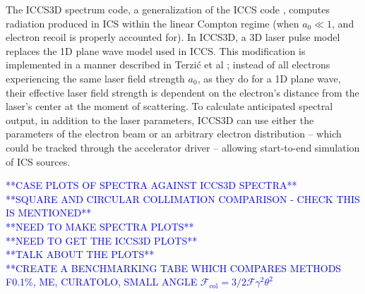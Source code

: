 \documentclass[../main.tex]{subfiles}
\begin{document}
The \textsc{ICCS3D} spectrum code, a generalization of the \textsc{ICCS} code \cite{krafft2016laser,ranjan2018simulation}, computes radiation produced in ICS within the linear Compton regime (when $a_{0}\ll 1$, and electron recoil is properly accounted for). In \textsc{ICCS3D}, a 3D laser pulse model replaces the 1D plane wave model used in \textsc{ICCS}. This modification is implemented in a manner described in Terzi\'c et al \cite{terzic2019improving}; instead of all electrons experiencing the same laser field strength $a_{0}$, as they do for a 1D plane wave, their effective laser field strength is dependent on the electron's distance from the laser's center at the moment of scattering. To calculate anticipated spectral output, in addition to the laser parameters, \textsc{ICCS3D} can use either the parameters of the electron beam or an arbitrary electron distribution -- which could be tracked through the accelerator driver -- allowing start-to-end simulation of ICS sources. 

\textcolor{blue}{**CASE PLOTS OF SPECTRA AGAINST ICCS3D SPECTRA** \\ **SQUARE AND CIRCULAR COLLIMATION COMPARISON - CHECK THIS IS MENTIONED** \\ **NEED TO MAKE SPECTRA PLOTS** \\ **NEED TO GET THE ICCS3D PLOTS** \\ **TALK ABOUT THE PLOTS** \\ **CREATE A BENCHMARKING TABE WHICH COMPARES METHODS F0.1\%, ME, CURATOLO, SMALL ANGLE $\mathcal{F}_{\mathrm{col}} = 3/2\mathcal{F}\gamma^{2}\theta^{2}$}
\end{document}
